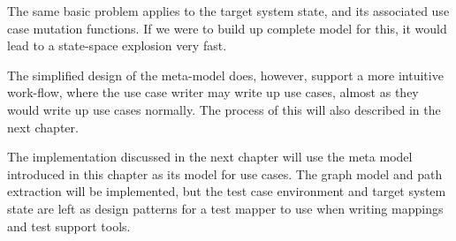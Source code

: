 \noindent
The same basic problem applies to the target system state, and its associated use case mutation functions. If we were to build up complete model for this, it would lead to a state-space explosion very fast.\medskip

\noindent The simplified design of the meta-model does, however, support a more intuitive work-flow, where the use case writer may write up use cases, almost as they would write up use cases normally. The process of this will also described in the next chapter.\medskip

\noindent The implementation discussed in the next chapter will use the meta model introduced in this chapter as its model for use cases. The graph model and path extraction will be implemented, but the test case environment and target system state are left as design patterns for a test mapper to use when writing mappings and test support tools.